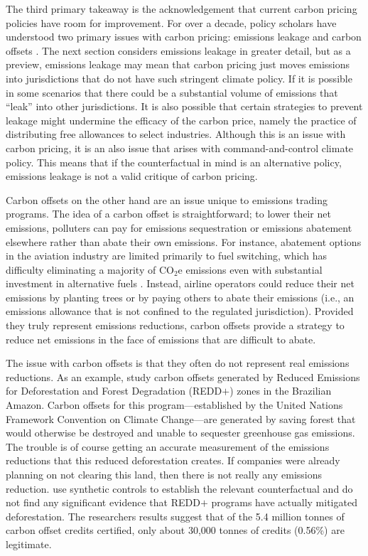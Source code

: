 The third primary takeaway is the acknowledgement that current carbon pricing policies have room for improvement. For over a decade, policy scholars have understood two primary issues with carbon pricing: emissions leakage and carbon offsets \citep{cullenward2014carbon}. The next section considers emissions leakage in greater detail, but as a preview, emissions leakage may mean that carbon pricing just moves emissions into jurisdictions that do not have such stringent climate policy. If it is possible in some scenarios that there could be a substantial volume of emissions that ``leak'' into other jurisdictions. It is also possible that certain strategies to prevent leakage might undermine the efficacy of the carbon price, namely the practice of distributing free allowances to select industries. Although this is an issue with carbon pricing, it is an also issue that arises with command-and-control climate policy. This means that if the counterfactual in mind is an alternative policy, emissions leakage is not a valid critique of carbon pricing.

Carbon offsets on the other hand are an issue unique to emissions trading programs. The idea of a carbon offset is straightforward; to lower their net emissions, polluters can pay for emissions sequestration or emissions abatement elsewhere rather than abate their own emissions. For instance, abatement options in the aviation industry are limited primarily to fuel switching, which has difficulty eliminating a majority of CO$_2$e emissions even with substantial investment in alternative fuels \citep{dray2022cost}. Instead, airline operators could reduce their net emissions by planting trees or by paying others to abate their emissions (i.e., an emissions allowance that is not confined to the regulated jurisdiction). Provided they truly represent emissions reductions, carbon offsets provide a strategy to reduce net emissions in the face of emissions that are difficult to abate.

The issue with carbon offsets is that they often do not represent real emissions reductions. As an example, \cite{west2020overstated} study carbon offsets generated by Reduced Emissions for Deforestation and Forest Degradation (REDD$+$) zones in the Brazilian Amazon. Carbon offsets for this program---established by the United Nations Framework Convention on Climate Change---are generated by saving forest that would otherwise be destroyed and unable to sequester greenhouse gas emissions. The trouble is of course getting an accurate measurement of the emissions reductions that this reduced deforestation creates. If companies were already planning on not clearing this land, then there is not really any emissions reduction. \cite{west2020overstated} use synthetic controls to establish the relevant counterfactual and do not find any significant evidence that REDD$+$ programs have actually mitigated deforestation. The researchers results suggest that of the 5.4 million tonnes of carbon offset credits certified, only about 30,000 tonnes of credits (0.56\%) are legitimate. 

